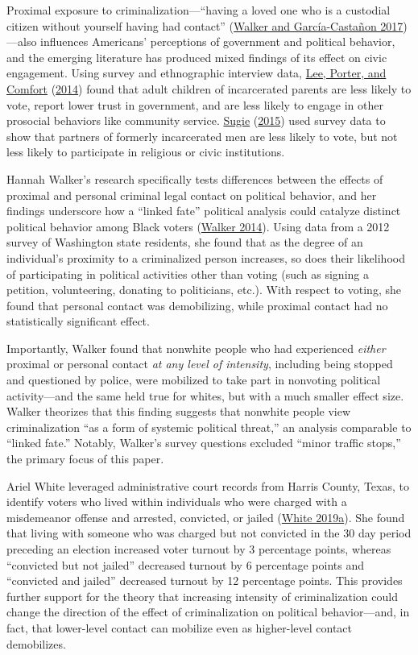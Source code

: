 \documentclass[
  12pt,
]{article}
\begin{document}
Proximal exposure to criminalization---``having a loved one who is a custodial citizen without yourself having had contact'' (\protect\hyperlink{ref-Walker2017}{Walker and García-Castañon 2017})---also influences Americans' perceptions of government and political behavior, and the emerging literature has produced mixed findings of its effect on civic engagement. Using survey and ethnographic interview data, \protect\hyperlink{ref-Lee2014}{Lee, Porter, and Comfort} (\protect\hyperlink{ref-Lee2014}{2014}) found that adult children of incarcerated parents are less likely to vote, report lower trust in government, and are less likely to engage in other prosocial behaviors like community service. \protect\hyperlink{ref-Sugie2015}{Sugie} (\protect\hyperlink{ref-Sugie2015}{2015}) used survey data to show that partners of formerly incarcerated men are less likely to vote, but not less likely to participate in religious or civic institutions.

Hannah Walker's research specifically tests differences between the effects of proximal and personal criminal legal contact on political behavior, and her findings underscore how a ``linked fate'' political analysis could catalyze distinct political behavior among Black voters (\protect\hyperlink{ref-Walker2014}{Walker 2014}). Using data from a 2012 survey of Washington state residents, she found that as the degree of an individual's proximity to a criminalized person increases, so does their likelihood of participating in political activities other than voting (such as signing a petition, volunteering, donating to politicians, etc.). With respect to voting, she found that personal contact was demobilizing, while proximal contact had no statistically significant effect.

Importantly, Walker found that nonwhite people who had experienced \emph{either} proximal or personal contact \emph{at any level of intensity}, including being stopped and questioned by police, were mobilized to take part in nonvoting political activity---and the same held true for whites, but with a much smaller effect size. Walker theorizes that this finding suggests that nonwhite people view criminalization ``as a form of systemic political threat,'' an analysis comparable to ``linked fate.'' Notably, Walker's survey questions excluded ``minor traffic stops,'' the primary focus of this paper.

Ariel White leveraged administrative court records from Harris County, Texas, to identify voters who lived within individuals who were charged with a misdemeanor offense and arrested, convicted, or jailed (\protect\hyperlink{ref-White2019}{White 2019a}). She found that living with someone who was charged but not convicted in the 30 day period preceding an election increased voter turnout by 3 percentage points, whereas ``convicted but not jailed'' decreased turnout by 6 percentage points and ``convicted and jailed'' decreased turnout by 12 percentage points. This provides further support for the theory that increasing intensity of criminalization could change the direction of the effect of criminalization on political behavior---and, in fact, that lower-level contact can mobilize even as higher-level contact demobilizes.
\end{document}
